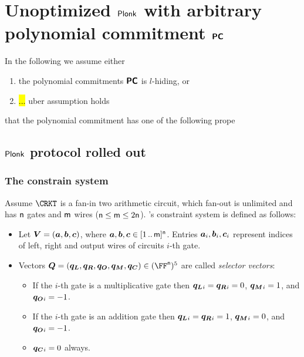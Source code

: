 \documentclass[runningheads,11pt]{llncs}
\let\spvec\vec
\let\vec\accentvec
\let\spvec\vec
\let\vec\spvec
\def\vec#1{\mathchoice{\mbox{\boldmath$\displaystyle#1$}}
  {\mbox{\boldmath$\textstyle#1$}} {\mbox{\boldmath$\scriptstyle#1$}}
  {\mbox{\boldmath$\scriptscriptstyle#1$}}}
\begin{document}
\section{Unoptimized $\textnormal{\textsf{Plonk}}$ with arbitrary polynomial commitment $\bm{\mathsf{PC}}$}
 In the following we assume either
 \begin{enumerate}
 \item the polynomial commitments $\bm{\mathsf{PC}}$ is $l$-hiding, or 
 \item \hl{...} uber assumption holds 
 \end{enumerate}
 that the polynomial commitment has one of the
 following prope
 \subsection{$\textnormal{\textsf{Plonk}}$ protocol rolled out}
\label{sec:plonk_explained}
\subsubsection{The constrain system}
Assume $\CRKT$ is a fan-in two arithmetic circuit,
which fan-out is unlimited and has $\mathsf{n}$ gates and $\mathsf{m}$ wires
($\mathsf{n} \leq \mathsf{m} \leq 2\mathsf{n}$). \plonk's constraint
system is defined as follows:
\begin{itemize}
\item Let $\vec{V} = (\va, \vb, \vc)$, where $\va, \vb, \vc
  \in \range{1}{\noofw}^\numberofconstrains$. Entries $\va_i, \vb_i, \vc_i$ represent indices of left,
  right and output wires of circuits $i$-th gate.
\item Vectors $\vec{Q} = (\vql, \vqr, \vqo, \vqm, \vqc) \in
  (\FF^\numberofconstrains)^5$ are called \emph{selector vectors}:
  \begin{itemize}
  \item If the $i$-th gate is a multiplicative gate then $\vql_i = \vqr_i = 0$,
    $\vqm_i = 1$, and $\vqo_i = -1$. 
  \item If the $i$-th gate is an addition gate then $\vql_i = \vqr_i  = 1$, $\vqm_i =
    0$, and $\vqo_i = -1$. 
  \item $\vqc_i = 0$ always. 
  \end{itemize}
\end{itemize}
\end{document}
